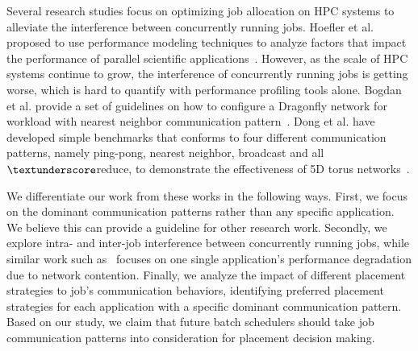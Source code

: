 Several research studies focus on optimizing job allocation on HPC systems 
to alleviate the interference between concurrently running jobs. 
Hoefler et al. proposed to use performance modeling techniques to analyze factors that 
impact the performance of parallel scientific applications~\cite{hoefler-modeling}. 
However, as the scale of HPC systems continue to grow, 
the interference of concurrently running jobs is getting worse, 
which is hard to quantify with performance profiling tools alone. 
Bogdan et al. provide a set of guidelines on how to configure a Dragonfly network 
for workload with nearest neighbor communication pattern~\cite{Bogdan-hpdc14}. 
Dong et al. have developed simple benchmarks that conforms to four different communication patterns, 
namely ping-pong, nearest neighbor, broadcast and all$\textunderscore$reduce, 
to demonstrate the effectiveness of 5D torus networks~\cite{Dong-SC11}.

We differentiate our work from these works in the following ways. 
First, we focus on the dominant communication patterns rather than any specific application. 
We believe this can provide a guideline for other research work. 
Secondly, we explore  intra- and inter-job interference between concurrently running jobs, 
while similar work such as~\cite{abhinav-sc13} focuses 
on one single application's performance degradation due to network contention. 
Finally, we analyze the impact of different placement strategies to job's communication behaviors, 
identifying preferred placement strategies for 
each application with a specific dominant communication pattern. 
Based on our study, we claim that future batch schedulers should take 
job communication patterns into consideration for placement decision making. 

